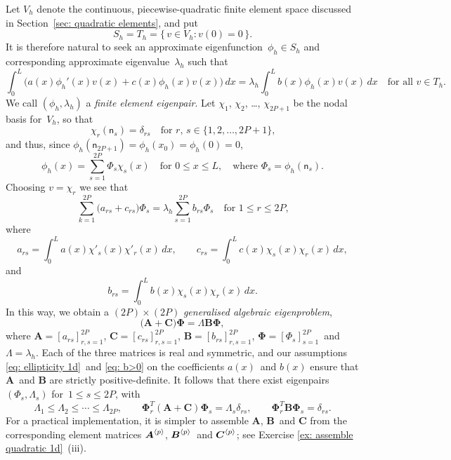 Let $V_h$ denote the continuous, piecewise-quadratic finite element space 
discussed in Section~\ref{sec: quadratic elements}, and put
\[
S_h=T_h=\{\,v\in V_h:v(0)=0\,\}.
\]
It is therefore natural to seek an approximate eigenfunction~$\phi_h\in S_h$
and corresponding approximate eigenvalue~$\lambda_h$ such that
\[
\int_0^L\bigl(a(x)\phi_h'(x)v(x)+c(x)\phi_h(x)v(x)\bigr)\,dx
	=\lambda_h\int_0^Lb(x)\phi_h(x)v(x)\,dx
\quad\text{for all $v\in T_h$.}
\]
We call $(\phi_h,\lambda_h)$ a \emph{finite element eigenpair}.
Let $\chi_1$, $\chi_2$, \dots, $\chi_{2P+1}$ be the nodal basis for~$V_h$, so 
that
\[
\chi_r(\mathsf{n}_s)=\delta_{rs}
	\quad\text{for $r$, $s\in\{1,2,\ldots, 2P+1\}$,}
\]
and thus, since $\phi_h(\mathsf{n}_{2P+1})=\phi_h(x_0)=\phi_h(0)=0$,
\[
\phi_h(x)=\sum_{s=1}^{2P}\Phi_s\chi_s(x)
	\quad\text{for $0\le x\le L$},
	\quad\text{where $\Phi_s=\phi_h(\mathsf{n}_s)$.}
\]
Choosing $v=\chi_r$ we see that
\[
\sum_{k=1}^{2P}\bigl(a_{rs}+c_{rs}\bigr)\Phi_s
	=\lambda_h\sum_{s=1}^{2P}b_{rs}\Phi_s\quad\text{for $1\le r\le 2P$,}
\]
where
\[
a_{rs}=\int_0^La(x)\chi'_s(x)\chi'_r(x)\,dx,\qquad
c_{rs}=\int_0^Lc(x)\chi_s(x)\chi_r(x)\,dx,
\]
and
\[
b_{rs}=\int_0^Lb(x)\chi_s(x)\chi_r(x)\,dx.
\]
In this way, we obtain a $(2P)\times(2P)$ \emph{generalised algebraic 
eigenproblem},
\[
\bigl(\boldsymbol{A}+\boldsymbol{C}\bigr)\boldsymbol{\Phi}
	=\Lambda\boldsymbol{B}\boldsymbol{\Phi},
\]
where $\boldsymbol{A}=[a_{rs}]_{r,s=1}^{2P}$, 
$\boldsymbol{C}=[c_{rs}]_{r,s=1}^{2P}$, 
$\boldsymbol{B}=[b_{rs}]_{r,s=1}^{2P}$, 
$\boldsymbol{\Phi}=[\Phi_s]_{s=1}^{2P}$~and 
$\Lambda=\lambda_h$.  Each of the three matrices is real and symmetric, and our 
assumptions \eqref{eq: ellipticity 1d}~and \eqref{eq: b>0} on the coefficients 
$a(x)$~and $b(x)$ ensure that $\boldsymbol{A}$~and $\boldsymbol{B}$ are 
strictly positive-definite.  It follows that there exist eigenpairs 
$(\Phi_s,\Lambda_s)$ for~$1\le s\le 2P$, with
\[
\Lambda_1\le\Lambda_2\le\cdots\le\Lambda_{2P},\qquad
\boldsymbol{\Phi}_r^T(\boldsymbol{A}+\boldsymbol{C})
    \boldsymbol{\Phi}_s=\Lambda_s\delta_{rs},\qquad
\boldsymbol{\Phi}_r^T\boldsymbol{B}\boldsymbol{\Phi}_s=\delta_{rs}.
\]
For a practical implementation, it is simpler to assemble $\boldsymbol{A}$, 
$\boldsymbol{B}$~and $\boldsymbol{C}$ from the corresponding element matrices
$\boldsymbol{A}^{\langle p\rangle}$, $\boldsymbol{B}^{\langle p\rangle}$~and 
$\boldsymbol{C}^{\langle p\rangle}$; see Exercise \ref{ex: assemble quadratic 1d}~(iii).

